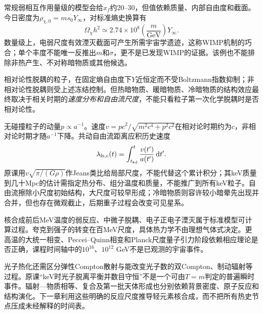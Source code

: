 常规弱相互作用量级的模型会给$x_f$约20--30，但值依赖质量、内部自由度和截面。今日密度为$\rho_{\chi,0}=m s_0Y_\infty$，对标准熵史换算有
\[
 \Omega_\chi h^2\simeq2.74\times10^8\left(\frac m{\mathrm{GeV}}\right)Y_\infty.
\]
数量级上，电弱尺度有效湮灭截面可产生所需宇宙学遗迹，这称WIMP机制的巧合；单个丰度不能唯一反推出$m$和$\sigma$，更不是已发现WIMP的证据。该例也不能排除非热产生、不对称暗物质或其他候选。

相对论性脱耦的粒子，在固定熵自由度下$Y$近恒定而不受Boltzmann指数抑制；非相对论性脱耦则受上述冻结控制。但热暗物质、暖暗物质、冷暗物质的结构效应最终取决于相关时期的\emph{速度分布和自由流尺度}，不能只看粒子第一次化学脱耦时是否相对论性。

无碰撞粒子的动量$p\propto a^{-1}$。速度$v=pc^2/\sqrt{m^2c^4+p^2c^2}$在相对论时期约为$c$，非相对论时期才随$a^{-1}$下降。共动自由流距离应积历史速度
\[
 \lambda_{\rm fs,c}(t)=\int_{t_{ \rm kd}}^t\frac{v(t')}{a(t')}\,\mathrm d t'.
\]
原课用$v\sqrt{\pi/(G\rho)}$作Jeans类比给局部尺度，不能代替这个累计积分；其keV质量到几十Mpc的估计需指定热分布、组分温度和质量，不能推广到所有keV粒子。自由流擦除小尺度初始结构，大尺度可较早形成；冷暗物质则容许较小暗晕先出现并合并，但也存在微观截止，后期重子过程会改变可见星系。

核合成前后MeV温度的弱反应、中微子脱耦、电子正电子湮灭属于标准模型可计算过程。夸克到强子的转变在百MeV尺度，具体热力学不由理想气体式决定。更高温的大统一相变、Peccei--Quinn相变和Planck尺度量子引力阶段依赖相应理论是否正确，课程时间轴中的$10^{16}$、$10^{12}$ GeV不是已观测的宇宙事件。

光子热化还需区分弹性Compton散射与能改变光子数的双Compton、制动辐射等过程。原课“keV时光子脱离平衡并数目守恒”不是一个可由$T=m$判定的普遍瞬时事件。辐射—物质相等、复合及第一批天体形成也分别依赖背景密度、原子反应和结构演化。下一章利用这些明确的反应尺度推导轻元素核合成，而不把所有热史节点压成未经解释的时间表。
